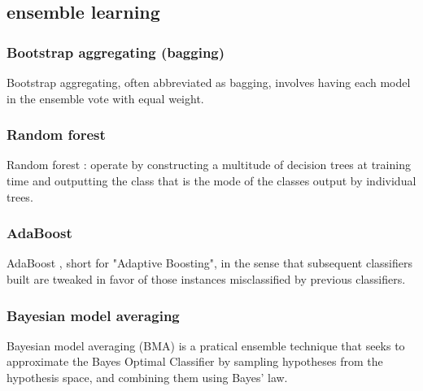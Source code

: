 \subsection{ensemble learning}

\subsubsection{Bootstrap aggregating (bagging)}
\cite{breiman1996bagging} Bootstrap aggregating, often abbreviated as bagging, involves having each model in the ensemble vote with equal weight.

\subsubsection{Random forest}

Random forest \cite{breiman2001random}: operate by constructing a multitude of decision trees at training time and outputting the class that is the mode of the classes output by individual trees. 

\subsubsection{AdaBoost}



AdaBoost \cite{freund1997decision}, short for "Adaptive Boosting", in the sense that subsequent classifiers built are tweaked in favor of those instances misclassified by previous classifiers. 


\subsubsection{Bayesian model averaging}

\cite{hoeting1999bayesian} Bayesian model averaging (BMA) is a pratical ensemble technique that seeks to approximate the Bayes Optimal Classifier by sampling hypotheses from the hypothesis space, and combining them using Bayes' law.